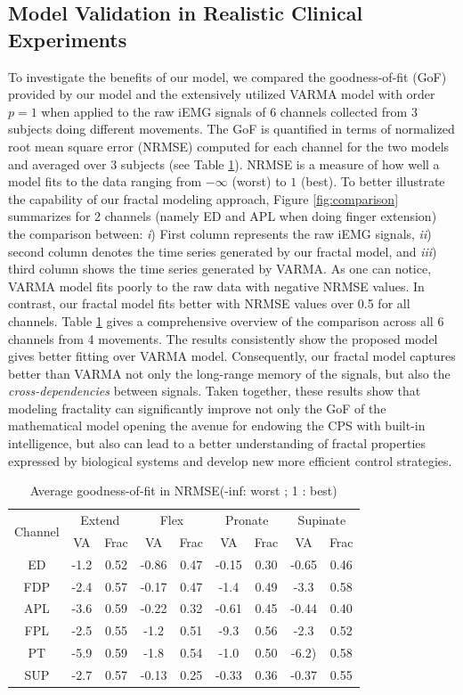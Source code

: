 \subsection{Model Validation in Realistic Clinical Experiments}
To investigate the benefits of our model, we compared the goodness-of-fit (GoF) provided by our model and the extensively utilized VARMA model with order $p=1$ when applied to the raw iEMG signals of 6 channels collected from 3 subjects doing different movements. The GoF is quantified in terms of normalized root mean square error (NRMSE) computed for each channel for the two models and averaged over 3 subjects (see Table \ref{tb:fit}). NRMSE is a measure of how well a model fits to the data ranging from $-\infty$ (worst) to $1$ (best). To better illustrate the capability of our fractal modeling approach, Figure  \ref{fig:comparison} summarizes for 2 channels (namely ED and APL when doing finger extension) the comparison between: \textit{i}) First column represents the raw iEMG signals, \textit{ii}) second column denotes the time series generated by our fractal model, and \textit{iii}) third column shows the time series generated by VARMA. As one can notice, VARMA model fits poorly to the raw data with negative NRMSE values. In contrast, our fractal model fits better with NRMSE values over 0.5 for all channels. Table \ref{tb:fit} gives a comprehensive overview of the comparison across all 6 channels from 4 movements. The results consistently show the proposed model gives better fitting over VARMA model. Consequently, our fractal model captures better than VARMA not only the long-range memory of the signals, but also the \textit{cross-dependencies} between signals. Taken together, these results show that modeling fractality can significantly improve not only the GoF of the mathematical model opening the avenue for endowing the CPS with built-in intelligence, but also can lead to a better understanding of fractal properties expressed by biological systems and develop new more efficient control strategies. 
\begin{table}[t]
\center
\caption{Average goodness-of-fit in NRMSE(-inf: worst ; 1 : best)}\label{tb:fit}
\begin{tabular}{|c|c|c|c|c|c|c|c|c|} \hline
\multirow{2}{*}{Channel} & \multicolumn{2}{|c|}{Extend} & \multicolumn{2}{|c|}{Flex} & \multicolumn{2}{|c|}{Pronate} & \multicolumn{2}{|c|}{Supinate} \\
\cline{2-9}
& VA & Frac & VA & Frac & VA & Frac & VA & Frac \\
\hline
ED & -1.2 & 0.52 & -0.86 & 0.47 & -0.15 & 0.30 & -0.65  & 0.46\\
\hline
FDP  & -2.4 & 0.57 & -0.17 & 0.47 & -1.4 & 0.49 & -3.3 & 0.58\\
\hline
APL  & -3.6 & 0.59 & -0.22 & 0.32 & -0.61 & 0.45 & -0.44  & 0.40 \\
\hline
FPL  & -2.5 & 0.55& -1.2 & 0.51 & -9.3 & 0.56 & -2.3  & 0.52\\
\hline
PT  &  -5.9 & 0.59 & -1.8 & 0.54 & -1.0 & 0.50 & -6.2)  & 0.58\\
\hline
SUP  &  -2.7 & 0.57 & -0.13 & 0.25 & -0.33 & 0.36 & -0.37  & 0.55\\
\hline
\end{tabular}
\end{table}
\vskip -2mm
